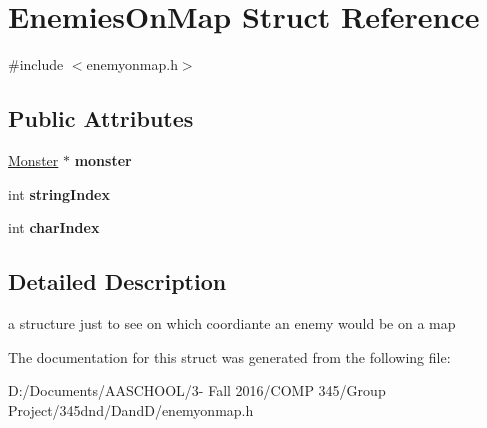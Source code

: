 \hypertarget{struct_enemies_on_map}{}\section{Enemies\+On\+Map Struct Reference}
\label{struct_enemies_on_map}


{\ttfamily \#include $<$enemyonmap.\+h$>$}

\subsection*{Public Attributes}
\begin{DoxyCompactItemize}
\item 
\hypertarget{struct_enemies_on_map_a0a241a198803a47b8f495e84051523e8}{}\label{struct_enemies_on_map_a0a241a198803a47b8f495e84051523e8} 
\hyperlink{class_monster}{Monster} $\ast$ {\bfseries monster}
\item 
\hypertarget{struct_enemies_on_map_adedb5b7ec6aa042d666a4ae11d4c3f15}{}\label{struct_enemies_on_map_adedb5b7ec6aa042d666a4ae11d4c3f15} 
int {\bfseries string\+Index}
\item 
\hypertarget{struct_enemies_on_map_a9f1724d8fe125d54cdb40f8ca2bcf301}{}\label{struct_enemies_on_map_a9f1724d8fe125d54cdb40f8ca2bcf301} 
int {\bfseries char\+Index}
\end{DoxyCompactItemize}


\subsection{Detailed Description}
a structure just to see on which coordiante an enemy would be on a map 

The documentation for this struct was generated from the following file\+:\begin{DoxyCompactItemize}
\item 
D\+:/\+Documents/\+A\+A\+S\+C\+H\+O\+O\+L/3-\/ Fall 2016/\+C\+O\+M\+P 345/\+Group Project/345dnd/\+Dand\+D/enemyonmap.\+h\end{DoxyCompactItemize}
